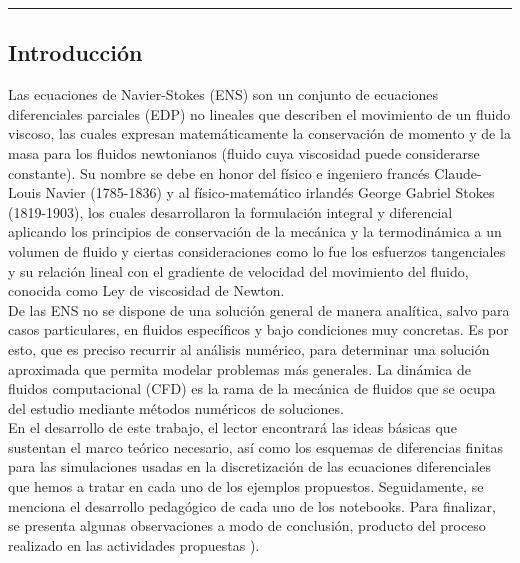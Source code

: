 \documentclass[A4,11pt]{article}
\begin{document}
\begin{center}\rule{0.9\textwidth}{0.1mm}
 \end{center}
\begin{multicols}{2}


\section{Introducción}

Las ecuaciones de Navier-Stokes (ENS) son un conjunto de ecuaciones diferenciales parciales (EDP) no lineales que describen el movimiento de un fluido viscoso, las cuales expresan matemáticamente la conservación de momento  y de la masa para los fluidos newtonianos (fluido cuya viscosidad puede considerarse constante)\cite{Achenson}.  Su nombre se debe en honor del físico e ingeniero francés Claude-Louis Navier (1785-1836) y al físico-matemático irlandés George Gabriel Stokes (1819-1903), los cuales desarrollaron la formulación integral y diferencial aplicando los principios de conservación de la mecánica y la termodinámica a un volumen de fluido y ciertas consideraciones como lo fue los esfuerzos tangenciales y su relación lineal con el gradiente de velocidad del movimiento del fluido, conocida como Ley de viscosidad de Newton\cite{Achenson}.\\


De las ENS no se dispone de una solución general de manera analítica, salvo para casos particulares, en fluidos específicos y bajo condiciones muy concretas\cite{Girault,Achenson}. Es por esto, que es preciso recurrir al análisis numérico, para determinar una solución aproximada que permita modelar problemas más generales. La dinámica de fluidos computacional (CFD) es la rama de la mecánica de fluidos que se ocupa del estudio mediante métodos numéricos de soluciones\cite{Barbagroup,Girault}.\\


En el desarrollo de este trabajo, el lector encontrará las ideas básicas que sustentan el marco teórico necesario, así como los esquemas de diferencias finitas para las simulaciones usadas en la discretización de las ecuaciones diferenciales que hemos a tratar en cada uno de los ejemplos propuestos. Seguidamente, se menciona el desarrollo pedagógico de cada uno de los notebooks. Para finalizar, se presenta algunas observaciones a modo de conclusión, producto del proceso realizado en las actividades propuestas \cite{LeonardoEC,LeonardoED,LeonardoEDP2d}).
\end{multicols}
\end{document}
